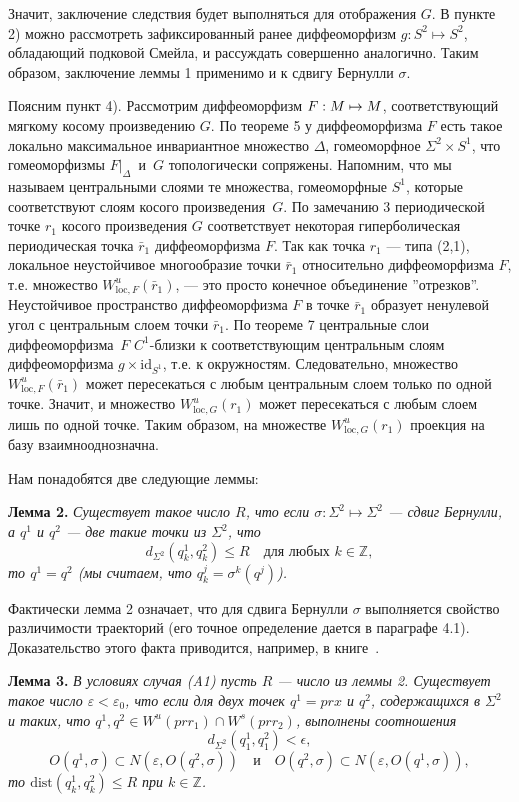\documentclass[12pt]{article}
\begin{document}
Значит, заключение следствия будет выполняться для отображения $G$. В пункте 2) можно рассмотреть зафиксированный ранее диффеоморфизм $g:S^2\mapsto S^2$, обладающий подковой Смейла, и рассуждать совершенно аналогично. 
Таким образом, заключение леммы 1 применимо и к сдвигу Бернулли $\sigma$. 
	
Поясним пункт 4). 
	 Рассмотрим диффеоморфизм $F:M\nobreak\mapsto\nobreak M$, соответствующий мягкому косому произведению $G$. По теореме 5
	 у диффеоморфизма $F$ есть такое локально максимальное инвариантное множество $\Delta$, гомеоморфное $\Sigma^2\times S^1$, что гомеоморфизмы $F|_{\Delta}$~и~$G$ топологически сопряжены. Напомним, что мы называем центральными слоями те множества, гомеоморфные $S^1$, которые соответствуют слоям косого произведения~$G$. 
	 По замечанию 3 периодической точке $r_1$ косого произведения $G$ соответствует некоторая гиперболическая периодическая точка $\bar{r}_1$ диффеоморфизма $F$.
Так как точка $r_1$ --- типа (2,1), локальное неустойчивое многообразие точки $\bar{r}_1$ относительно диффеоморфизма $F$, т.е. множество $W^u_{\textrm{loc}, F}(\bar{r}_1)$, --- это просто конечное объединение ''отрезков''. Неустойчивое пространство диффеоморфизма $F$ в точке $\bar{r}_1$ образует ненулевой угол с центральным слоем точки $\bar{r}_1$. По теореме 7 центральные слои диффеоморфизма~$F$ $C^1$-близки к соответствующим центральным слоям диффеоморфизма $g\times\mbox{id}_{S^1}$, т.е. к окружностям.
Следовательно, множество  
$W^u_{\textrm{loc}, F}(\bar{r}_1)$ может пересекаться с любым центральным слоем только по одной точке. Значит, и множество
$W^u_{\textrm{loc}, G}(r_1)$ может пересекаться с любым слоем лишь по одной точке. Таким образом, на множестве
$W^u_{\textrm{loc}, G}(r_1)$ проекция на базу взаимнооднозначна.
	
	Нам понадобятся две следующие леммы:

\textbf{Лемма 2.}\textit{ Существует такое число $R$, что если $\sigma:\Sigma^2\mapsto\Sigma^2$ --- сдвиг Бернулли, а $q^1$ и $q^2$ --- две такие точки из $\Sigma^2$, что
$$d_{\Sigma^2}(q^1_k,q^2_k)\leq R\quad\textrm{для любых }k\in\mathbb{Z},$$
то $q^1=q^2$ (мы считаем, что $q^j_k=\sigma^k(q^j)$).}

Фактически лемма 2 означает, что для сдвига Бернулли $\sigma$ выполняется свойство различимости траекторий (его точное определение дается в параграфе 4.1). Доказательство этого факта приводится, например, в книге~\cite{16}.

\textbf{Лемма 3.}\textit{ В условиях случая (A1) пусть $R$ --- число из леммы 2. Существует такое число $\varepsilon<\varepsilon_0$, что если для двух точек $q^1=pr x$ и $q^2$, содержащихся в $\Sigma^2$ и таких, что $q^1,q^2\in W^u(pr r_1)\cap W^s(pr r_2)$, выполнены соотношения $$d_{\Sigma^2}(q_1^1,q_1^2)<\epsilon,$$ 
$$O(q^1,\sigma)\subset N(\varepsilon,O(q^2,\sigma))\quad\textrm{и}\quad O(q^2,\sigma)\subset N(\varepsilon, O(q^1,\sigma)),$$
то $\textrm{dist}(q^1_k,q^2_k)\leq R$ при $k\in\mathbb{Z}$.}
\end{document}
